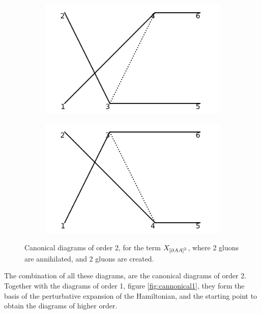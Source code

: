\documentclass[11pt,a4paper,twoside,pdf]{article}
\numberwithin{equation}{section}
\begin{document}
\begin{figure}[h!]
\begin{subfigure}[t]{0.24\textwidth}
        \caption{ }
    \end{subfigure}
    \begin{subfigure}[t]{0.24\textwidth}
        \centering
        \includegraphics[width=\textwidth]{plots/canonical/order2/7.png}
        \caption{ }
    \end{subfigure}
    \begin{subfigure}[t]{0.24\textwidth}
        \centering
        \includegraphics[width=\textwidth]{plots/canonical/order2/8.png}
        \caption{ }
    \end{subfigure}
    \caption{Canonical diagrams of order 2, for the term $X_{\left[ \partial AA \right]^2}$, 
    where 2 gluons are annihilated, and 2 gluons are created.}
    \label{fig:cannonical2_2to2}
\end{figure}

\newpage

The combination of all these diagrams, are the canonical diagrams of order 2.
Together with the diagrams of order 1, figure \ref{fig:cannonical1},
they form the basis of the perturbative expansion of the Hamiltonian, and the
starting point to obtain the diagrams of higher order.
\end{document}
